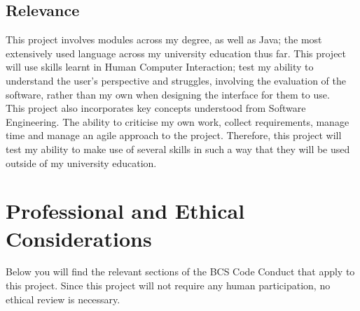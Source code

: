 \documentclass[a4paper, 12pt]{article}
\begin{document}
            \subsection{Relevance}
            This project involves modules across my degree, as well as Java; the most extensively
            used language across my university education thus far. This project will use skills learnt
            in Human Computer Interaction; test my ability to understand the user's perspective and
            struggles, involving the evaluation of the software, rather than my own when designing
            the interface for them to use. \\
        
            This project also incorporates key concepts understood from Software Engineering.
            The ability to criticise my own work, collect requirements, manage time and manage an
            agile approach to the project. Therefore, this project will test my ability to make use
            of several skills in such a way that they will be used outside of my university education.

    \clearpage
    \section{Professional and Ethical Considerations}
        Below you will find the relevant sections of the BCS Code Conduct that apply to this 
        project. Since this project will not require any human participation, no ethical review 
        is necessary.
\end{document}
